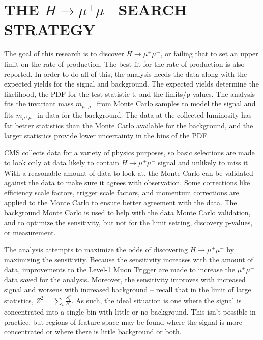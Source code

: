 \chapter{THE $H\rightarrow\mu^+\mu^-$ SEARCH STRATEGY} \label{strategy}

The goal of this research is to discover $H\rightarrow\mu^+\mu^-$, or failing that to set an upper limit on the rate of production. The best fit for the rate of production is also reported. In order to do all of this, the analysis needs the data along with the expected yields for the signal and background. The expected yields determine the likelihood, the PDF for the test statistic t, and the limits/p-values. The analysis fits the invariant mass $m_{\mu^+\mu^-}$ from Monte Carlo samples to model the signal and fits $m_{\mu^+\mu^-}$ in data for the background. The data at the collected luminosity has far better statistics than the Monte Carlo available for the background, and the larger statistics provide lower uncertainty in the bins of the PDF. 

CMS collects data for a variety of physics purposes, so basic selections are made to look only at data likely to contain $H\rightarrow\mu^+\mu^-$ signal and unlikely to miss it. With a reasonable amount of data to look at, the Monte Carlo can be validated against the data to make sure it agrees with observation. Some corrections like efficiency scale factors, trigger scale factors, and momentum corrections are applied to the Monte Carlo to ensure better agreement with the data. The background Monte Carlo is used to help with the data Monte Carlo validation, and to optimize the sensitivity, but not for the limit setting, discovery p-values, or measurement.  

The analysis attempts to maximize the odds of discovering $H\rightarrow\mu^+\mu^-$ by maximizing the sensitivity. Because the sensitivity increases with the amount of data, improvements to the Level-1 Muon Trigger are made to increase the $\mu^+\mu^-$ data saved for the analysis. Moreover, the sensitivity improves with increased signal and worsens with increased background -- recall that in the limit of large statistics, $Z^2=\sum_i\frac{S_i^2}{B_i}$. As such, the ideal situation is one where the signal is concentrated into a single bin with little or no background. This isn't possible in practice, but regions of feature space may be found where the signal is more concentrated or where there is little background or both. 

